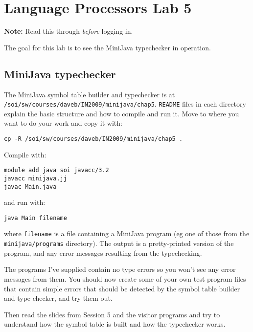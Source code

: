 \documentclass{article}
\begin{document}
\thispagestyle{empty}

\section*{Language Processors Lab 5}

{\bf Note:} Read this through {\em before\/} logging in.

\medskip\noindent The goal for this
lab is to see the MiniJava typechecker in operation.


\subsection*{MiniJava typechecker}

The MiniJava symbol table builder and typechecker is at
 \verb+/soi/sw/courses/daveb/IN2009/minijava/chap5+.
\verb+README+ files in each directory explain the basic structure
and how to compile and run it.
Move to where you want to do your work and copy it with:
\begin{verbatim}
cp -R /soi/sw/courses/daveb/IN2009/minijava/chap5 .
\end{verbatim}
Compile with:
\begin{verbatim}
module add java soi javacc/3.2
javacc minijava.jj
javac Main.java
\end{verbatim}
and run with:
\begin{verbatim}
java Main filename
\end{verbatim}
where \verb+filename+ is a file containing a MiniJava program (eg one of
those from the \verb+minijava/programs+ directory).
The output is a pretty-printed version of the program, and any error messages
resulting from the typechecking.

The programs I've supplied contain no type errors so you won't
see any error messages from them. You should now create some of
your own test program files that contain simple errors that
should be detected by the symbol table builder and type checker, and try them out.

Then read the slides from Session 5 and the visitor programs and try to 
understand how the symbol table is built and how the typechecker works.
\end{document}
